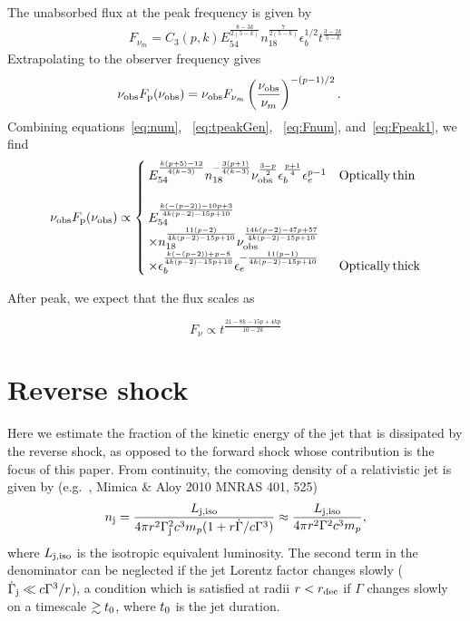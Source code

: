 \documentclass[usenatbib,fleqn]{mnras}
\begin{document}
The unabsorbed flux at the peak frequency is given by
\begin{align}
  F_{\nu_m} =  C_3(p, k) E_{54}^{\frac{8-3 k}{2 (5-k)}}
  n_{18}^{\frac{7}{2 (5-k)}} \epsilon_b^{1/2} t^{\frac{3-2 k}{5-k}}
\label{eq:Fnum}
\end{align}
%
Extrapolating to the observer frequency gives 
\begin{align}
  \nu_{\rm obs} F_{\rm p} (\nu_{\rm obs}) &= \nu_{\rm obs}   F_{\nu_m}
  \left(\frac{\nu_{\rm obs}}{\nu_m}\right)^{-(p-1)/2}.
  \label{eq:Fpeak1}
\end{align}
%
Combining equations~\eqref{eq:num}, ~\eqref{eq:tpeakGen}, ~\eqref{eq:Fnum},
and~\eqref{eq:Fpeak1}, we find
\begin{align}
  \nu_{\rm obs} F_{\rm p} (\nu_{\rm obs}) \propto
  \begin{cases}
    E_{54}^{\frac{k (p+5)-12}{4 (k-3)}} n_{18}^{-\frac{3 (p+1)}{4
        (k-3)}} \nu_{\rm obs}^{\frac{3-p}{2}}
    \epsilon_b^{\frac{p+1}{4}} \epsilon_e^{p-1} & {\rm Optically\, thin}\\\\
    E_{54}^{\frac{k(-(p-2))-10 p+3}{4 k (p-2)-15 p+10}} \\ \times
    n_{18}^{\frac{11 (p-2)}{4 k (p-2)-15 p+10}} \nu_{\rm
      obs}^{\frac{14 k (p-2)-47 p+57}{4 k (p-2)-15 p+10}} \\ \times
    \epsilon_b^{\frac{k (-(p-2))+p-8}{4 k(p-2)-15 p+10}}
    \epsilon_e^{-\frac{11 (p-1)}{4 k (p-2)-15p+10}} & {\rm Optically\,
    thick}
  \end{cases}
  \label{eq:peakLumGen}
\end{align}

After peak, we expect that the flux scales as 

\begin{equation}
F_{\nu}\propto t^{\frac{21-8k-15p+4kp}{10-2k}}
\label{eq:tslope}
\end{equation}



\section{Reverse shock}
\label{sec:reverse}
Here we estimate the fraction of the kinetic energy of the jet that is
dissipated by the reverse shock, as opposed to the forward shock whose
contribution is the focus of this paper.  From continuity, the
comoving density of a relativistic jet is given by
(e.g.~\citealt{Beloborodov&Uhm2006},  Mimica \& Aloy 2010 MNRAS 401, 525)
 \begin{align}
   n_{\rm j} =  \frac{L_{\rm j, iso}}{4 \pi r^{2}\Gamma_{\rm
       j}^{2}c^{3}m_p(1 + r \dot{\Gamma}/c\Gamma^{3})}
   \approx  \frac{L_{\rm j, iso}}{4 \pi r^{2}\Gamma^{2}c^{3}m_p},
\end{align}
%
where $L_{\rm j, iso}$ is the isotropic equivalent luminosity.  The
second term in the denominator can be neglected if the jet Lorentz
factor changes slowly ($\dot{\Gamma}_{\rm j} \ll c\Gamma^{3}/r$), a
condition which is satisfied at radii $r < r_{\rm dec}$ if $\Gamma$
changes slowly on a timescale $\gtrsim t_{\rm 0}$, where $t_{\rm 0}$
is the jet duration.
\end{document}
